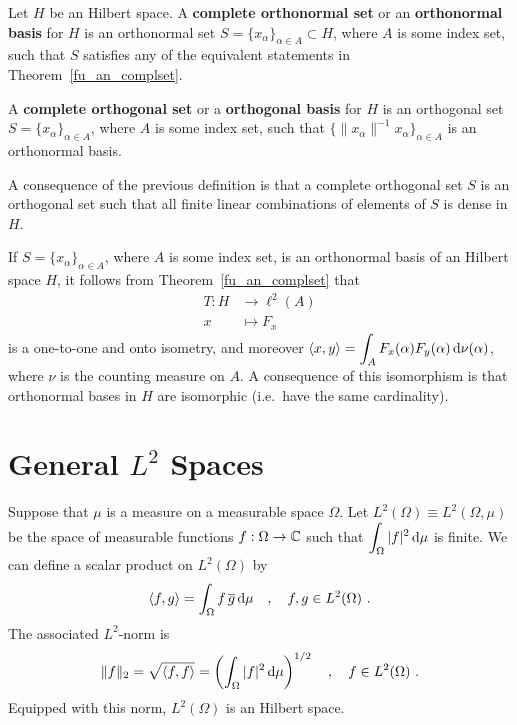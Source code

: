 \begin{defn}
Let $H$ be an Hilbert space.  A
{\bfseries complete orthonormal set}
or an {\bfseries orthonormal basis} for $H$
is an orthonormal set
$\displaystyle S = \{ x_\alpha \}_{\alpha \in A} \subset H$, where $A$ is
some index set, such that $S$ satisfies any of the equivalent statements in
Theorem~\ref{fu_an_complset}.

A {\bfseries complete orthogonal set}
or a {\bfseries orthogonal basis} for
$H$ is an orthogonal set $S = \{ x_\alpha \}_{\alpha \in A}$, where $A$ is
some index set, such that
$\displaystyle \{ \|x_\alpha\|^{-1} x_\alpha \}_{\alpha \in A}$ is an
orthonormal basis.
\end{defn}

A consequence of the previous definition is that a complete orthogonal set
$S$ is an orthogonal set such that all finite linear combinations of elements
of $S$ is dense in $H$.

If $\displaystyle S = \{ x_\alpha \}_{\alpha \in A}$, where $A$ is some index
set, is an orthonormal basis of an Hilbert space $H$, it follows from
Theorem~\ref{fu_an_complset} that
\begin{equation} \label{fu_an_isoL2}
\begin{split}
T: H & \rightarrow \ell^2(A) \\
 x &\mapsto F_x
\end{split}
\end{equation}
is a one-to-one and onto isometry, and moreover
$\displaystyle \left\langle{x} , {y}\right\rangle = \int_A F_x(\alpha)F_y(\alpha) \,\mathrm{d}{\nu(\alpha)}$,
where $\nu$ is the counting measure on $A$.  A consequence of this
isomorphism is that orthonormal bases in $H$ are isomorphic (i.e.\ have
the same cardinality).

\section{General $\displaystyle L^2$ Spaces}\label{SectGenL2}

Suppose that $\mu$ is a measure on a measurable space $\Omega$.
Let $\displaystyle L^2(\Omega) \equiv L^2(\Omega, \mu)$ be the space
of measurable functions $f:\Omega \rightarrow \mathbb{C}$ such that
$\displaystyle \int_\Omega |f|^2 \,\mathrm{d}{\mu}$ is finite.  We can define
a scalar product on $\displaystyle L^2(\Omega)$ by
\[
\left\langle{f} , {g}\right\rangle = \int_\Omega f\, \overline{g} \,\mathrm{d}{\mu} \quad , \quad
f, g \in L^2(\Omega) \ .
\]
The associated $\displaystyle L^2$-norm is
\[
\| f \|_2 = \sqrt{\left\langle{f} , {f}\right\rangle} = \left(\int_\Omega |f|^2 \,\mathrm{d}{\mu}\right)^{1/2}
\quad , \quad  f \in L^2(\Omega) \ .
\]
Equipped with this norm, $\displaystyle L^2(\Omega)$ is an Hilbert space.

